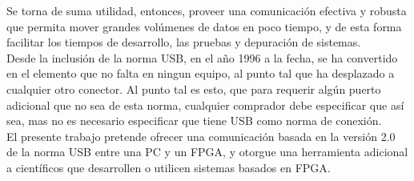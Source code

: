 Se torna de suma utilidad, entonces, proveer una comunicación efectiva y robusta que permita mover grandes volúmenes de datos en poco tiempo, y de esta forma facilitar los tiempos de desarrollo, las pruebas y depuración de sistemas.\\

Desde la inclusión de la norma USB, en el año 1996 a la fecha, se ha convertido en el elemento que no falta en ningun equipo, al punto tal que ha desplazado a cualquier otro conector. Al punto tal es esto, que para requerir algún puerto adicional que no sea de esta norma, cualquier comprador debe especificar que así sea, mas no es necesario especificar que tiene USB como norma de conexión.\\

El presente trabajo pretende ofrecer una comunicación basada en la versión 2.0 de la norma USB entre una PC y un FPGA, y otorgue una herramienta adicional a científicos que desarrollen o utilicen sistemas basados en FPGA.\\
%
%
%
%
%




